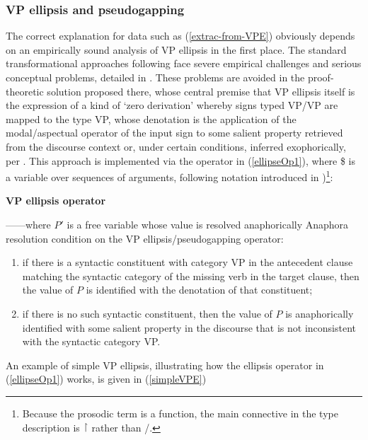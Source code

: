 \documentclass[output=paper,colorlinks,citecolor=brown]{langscibook}
\begin{document}
\subsubsection{VP ellipsis and pseudogapping}\label{subsubsec:VPE}

The correct explanation for data such as (\ref{extrac-from-VPE}) obviously
depends on an empirically sound analysis of VP ellipsis in the first
place. The standard transformational approaches following \citet{kuno1981}
face severe empirical challenges and serious conceptual problems,
detailed in \citet{kubota-levine-pseudo}. These problems are avoided in the
proof-theoretic solution proposed there, whose central premise that VP
ellipsis itself is the expression of a kind of `zero derivation'
whereby signs typed VP/VP are mapped to the type VP, whose denotation
is the application of the modal/aspectual operator of the input sign
to some salient property retrieved from the discourse context or,
under certain conditions, inferred exophorically, per
\citet{MillerPullum13}. This approach is implemented via the operator in
(\ref{ellipseOp1}), where \$ is a variable over sequences of arguments,
following notation introduced in \citet{steedman2000a})\footnote{Because the
prosodic term is a function, the main connective in the type
description is \ensuremath{\vs} rather than /.}:

\begin{exe}
 \ex\label{ellipseOp1}
  \textbf{VP ellipsis operator} \\
  
  ------where $P'$ is a free variable whose value is
  resolved anaphorically
 \ex\label{Acondition}
  Anaphora resolution condition on the VP ellipsis/pseudogapping
  operator:
  \begin{enumerate}
   \item 
    if there is a syntactic  constituent
    with category VP in the antecedent clause matching the
    syntactic  category of the missing verb in the target clause,
    then the value of $P$ is identified with the denotation of that constituent;
   \item 
    if there is no such syntactic  constituent, then the value of $P$  is anaphorically
    identified with some salient property in the discourse that is not
    inconsistent with the syntactic  category VP.
  \end{enumerate}
\end{exe}
An example of simple VP ellipsis, illustrating how the ellipsis operator
in (\ref{ellipseOp1}) works, is given in (\ref{simpleVPE})
\end{document}
